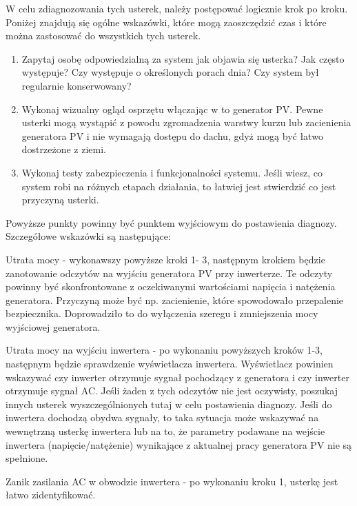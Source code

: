 \documentclass[12pt,a4paper]{article}
\begin{document}
W celu zdiagnozowania tych usterek, należy postępować logicznie krok po 
kroku. Poniżej znajdują się ogólne wskazówki, które mogą zaoszczędzić 
czas i które można zastosować do wszystkich tych usterek. 


\begin{enumerate}
\item Zapytaj osobę odpowiedzialną za system jak objawia się usterka? 
Jak często występuje? Czy występuje o określonych porach dnia? Czy 
system był regularnie konserwowany? 
\item Wykonaj wizualny ogląd osprzętu włączając w to generator PV. Pewne 
usterki mogą wystąpić z powodu zgromadzenia warstwy kurzu lub 
zacienienia generatora PV i nie wymagają dostępu do dachu, gdyż mogą być 
łatwo dostrzeżone z ziemi. 
\item Wykonaj testy zabezpieczenia i funkcjonalności systemu. Jeśli 
wiesz, co system robi na różnych etapach działania, to łatwiej jest stwierdzić co jest przyczyną usterki. 

\end{enumerate}

 

Powyższe punkty powinny być punktem wyjściowym do postawienia diagnozy. 
Szczegółowe wskazówki są następujące: 

 

Utrata mocy - wykonawszy powyższe kroki 1- 3, następnym krokiem będzie 
zanotowanie odczytów na wyjściu generatora PV przy inwerterze. Te 
odczyty powinny być skonfrontowane z oczekiwanymi wartościami napięcia i 
natężenia generatora. Przyczyną może być np. zacienienie, które 
spowodowało przepalenie bezpiecznika. Doprowadziło to do wyłączenia 
szeregu i zmniejszenia mocy wyjściowej generatora. 

 

Utrata mocy na wyjściu inwertera - po wykonaniu powyższych kroków 1-3, 
następnym będzie sprawdzenie wyświetlacza inwertera. Wyświetlacz 
powinien wskazywać czy inwerter otrzymuje sygnał pochodzący z generatora 
i czy inwerter otrzymuje sygnał AC. Jeśli żaden z tych odczytów nie jest 
oczywisty, poszukaj innych usterek wyszczególnionych tutaj w celu 
postawienia diagnozy. Jeśli do inwertera dochodzą obydwa sygnały, to 
taka sytuacja może wskazywać na wewnętrzną usterkę inwertera lub na to, 
że parametry podawane na wejście inwertera (napięcie/natężenie) 
wynikające z aktualnej pracy generatora PV nie są spełnione. 

 

Zanik zasilania AC w obwodzie inwertera - po wykonaniu kroku 1, usterkę 
jest łatwo zidentyfikować. 
\end{document}
